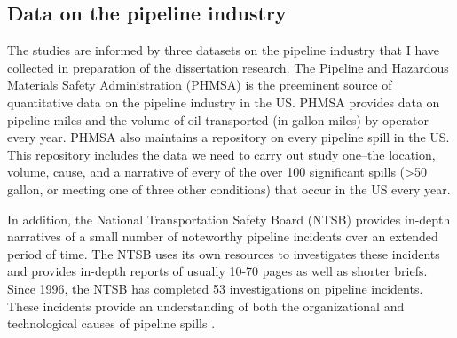
\subsection*{Data on the pipeline industry}

The studies are informed by three datasets on the pipeline industry that I have collected in preparation of the dissertation research. The Pipeline and Hazardous Materials Safety Administration (PHMSA) is the preeminent source of quantitative data on the pipeline industry in the US. PHMSA provides data on pipeline miles and the volume of oil transported (in gallon-miles) by operator every year. PHMSA also maintains a repository on every pipeline spill in the US. This repository includes the data we need to carry out study one--the location, volume, cause, and a narrative of every of the over 100 significant spills (>50 gallon, or meeting one of three other conditions) that occur in the US every year.

In addition, the National Transportation Safety Board (NTSB) provides in-depth narratives of a small number of noteworthy pipeline incidents over an extended period of time. The NTSB uses its own resources to investigates these incidents and provides in-depth reports of usually 10-70 pages as well as shorter briefs. Since 1996, the NTSB has completed 53 investigations on pipeline incidents. These incidents provide an understanding of both the organizational and technological causes of pipeline spills \citep[cf.][]{Perrow1984}.